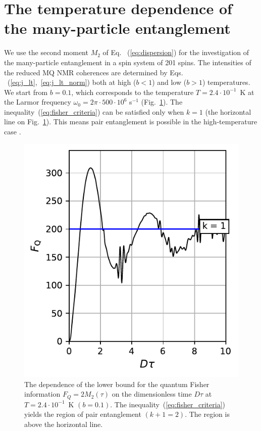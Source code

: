 \section{The temperature dependence of the many-particle entanglement}
\label{sec:entanglement}
We use  the second moment $M_2$ of Eq. ~(\ref{eq:dispersion}) for the investigation of the many-particle entanglement in a spin system of 201 spins. 
The intensities of the reduced MQ NMR coherences are determined by Eqs.  ~(\ref{eq:j_lt},~\ref{eq:j_lt_norm}) both at high ($b < 1$) and low ($b > 1$) temperatures. 
We start from $b = 0.1$, which corresponds to the temperature ${T= 2.4\cdot 10^{-1}}$~K at the Larmor frequency $\omega_0 = 2\pi\cdot 500\cdot10^6$ s$^{-1}$ (Fig.~\ref{fig:m2_t_b01}). 
The inequality~(\ref{eq:fisher_criteria}) can be satisfied only when $k=1$ (the horizontal line on Fig.~\ref{fig:m2_t_b01}). 
This means pair entanglement is possible in the high-temperature case \cite{lab:mq_mnr_qinfo_2012}. \begin{figure}
    \centering
    \includegraphics{src/m2_t_b01.pdf}
    \caption{The dependence of the lower bound for the quantum Fisher information $F_Q = 2M_2(\tau)$ on the dimensionless time $D\tau$ at ${T=2.4\cdot10^{-1}}$~K $(b=0.1)$. 
    The inequality~(\ref{eq:fisher_criteria}) yields the region of pair entanglement $(k+1=2)$. The region is above the horizontal line. 
    }
    \label{fig:m2_t_b01}
\end{figure}
